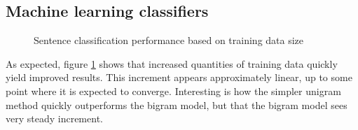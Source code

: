 \documentclass[a4paper,11pt]{kth-mag}
\begin{document}
\subsection{Machine learning classifiers}

\begin{figure}[h]
  \centering

  \caption{Sentence classification performance based on training data size}
  \label{fig:data_size}
\end{figure}


As expected, figure \ref {fig:data_size} shows that increased quantities of training data quickly yield improved results. This increment appears approximately linear, up to some point where it is expected to converge. Interesting is how the simpler unigram method quickly outperforms the bigram model, but that the bigram model sees very steady increment.

\pagebreak
\end{document}
